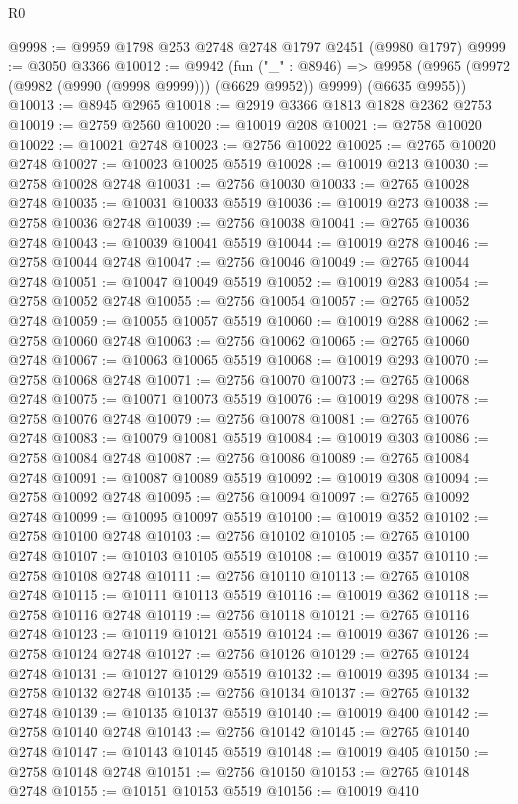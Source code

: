 \begin{lexlean}{R0}
\begin{coremodule}
@9998 := @9959 @1798 @253 @2748 @2748 @1797 @2451 (@9980 @1797)
@9999 := @3050 @3366
@10012 := @9942
    (fun ("_" : @8946) =>
    @9958 (@9965 (@9972 (@9982 (@9990 (@9998 @9999))) (@6629 @9952)) @9999) (@6635 @9955))
@10013 := @8945 @2965
@10018 := @2919 @3366 @1813 @1828 @2362 @2753
@10019 := @2759 @2560
@10020 := @10019 @208
@10021 := @2758 @10020
@10022 := @10021 @2748
@10023 := @2756 @10022
@10025 := @2765 @10020 @2748
@10027 := @10023 @10025 @5519
@10028 := @10019 @213
@10030 := @2758 @10028 @2748
@10031 := @2756 @10030
@10033 := @2765 @10028 @2748
@10035 := @10031 @10033 @5519
@10036 := @10019 @273
@10038 := @2758 @10036 @2748
@10039 := @2756 @10038
@10041 := @2765 @10036 @2748
@10043 := @10039 @10041 @5519
@10044 := @10019 @278
@10046 := @2758 @10044 @2748
@10047 := @2756 @10046
@10049 := @2765 @10044 @2748
@10051 := @10047 @10049 @5519
@10052 := @10019 @283
@10054 := @2758 @10052 @2748
@10055 := @2756 @10054
@10057 := @2765 @10052 @2748
@10059 := @10055 @10057 @5519
@10060 := @10019 @288
@10062 := @2758 @10060 @2748
@10063 := @2756 @10062
@10065 := @2765 @10060 @2748
@10067 := @10063 @10065 @5519
@10068 := @10019 @293
@10070 := @2758 @10068 @2748
@10071 := @2756 @10070
@10073 := @2765 @10068 @2748
@10075 := @10071 @10073 @5519
@10076 := @10019 @298
@10078 := @2758 @10076 @2748
@10079 := @2756 @10078
@10081 := @2765 @10076 @2748
@10083 := @10079 @10081 @5519
@10084 := @10019 @303
@10086 := @2758 @10084 @2748
@10087 := @2756 @10086
@10089 := @2765 @10084 @2748
@10091 := @10087 @10089 @5519
@10092 := @10019 @308
@10094 := @2758 @10092 @2748
@10095 := @2756 @10094
@10097 := @2765 @10092 @2748
@10099 := @10095 @10097 @5519
@10100 := @10019 @352
@10102 := @2758 @10100 @2748
@10103 := @2756 @10102
@10105 := @2765 @10100 @2748
@10107 := @10103 @10105 @5519
@10108 := @10019 @357
@10110 := @2758 @10108 @2748
@10111 := @2756 @10110
@10113 := @2765 @10108 @2748
@10115 := @10111 @10113 @5519
@10116 := @10019 @362
@10118 := @2758 @10116 @2748
@10119 := @2756 @10118
@10121 := @2765 @10116 @2748
@10123 := @10119 @10121 @5519
@10124 := @10019 @367
@10126 := @2758 @10124 @2748
@10127 := @2756 @10126
@10129 := @2765 @10124 @2748
@10131 := @10127 @10129 @5519
@10132 := @10019 @395
@10134 := @2758 @10132 @2748
@10135 := @2756 @10134
@10137 := @2765 @10132 @2748
@10139 := @10135 @10137 @5519
@10140 := @10019 @400
@10142 := @2758 @10140 @2748
@10143 := @2756 @10142
@10145 := @2765 @10140 @2748
@10147 := @10143 @10145 @5519
@10148 := @10019 @405
@10150 := @2758 @10148 @2748
@10151 := @2756 @10150
@10153 := @2765 @10148 @2748
@10155 := @10151 @10153 @5519
@10156 := @10019 @410

\end{coremodule}
\end{lexlean}
